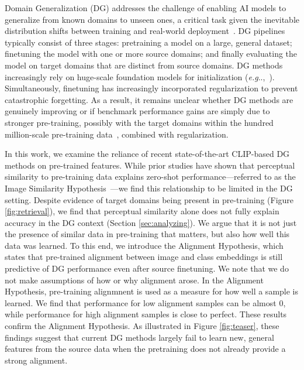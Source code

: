 \documentclass{article} %
\makeatletter
\DeclareRobustCommand\onedot{\futurelet\@let@token\@onedot}
\def\@onedot{\ifx\@let@token.\else.\null\fi\xspace}
\def\eg{\emph{e.g}\onedot} \def\Eg{\emph{E.g}\onedot}
\makeatother
\begin{document}
Domain Generalization (DG) addresses the challenge of enabling AI models to generalize from known domains to unseen ones, a critical task given the inevitable distribution shifts between training and real-world deployment~\citep{saenko2010adapting}. DG pipelines typically consist of three stages: pretraining a model on a large, general dataset; finetuning the model with one or more source domains; and finally evaluating the model on target domains that are distinct from source domains. DG methods increasingly rely on huge-scale foundation models for initialization (\eg,~\citep{shu2023clipood,cha2022miro,addepalli2024leveraging}). Simultaneously, finetuning has increasingly incorporated regularization to prevent catastrophic forgetting. As a result, it remains unclear whether DG methods are genuinely improving or if  benchmark performance gains are simply due to stronger pre-training, possibly with the target domains within the hundred million-scale pre-training data~\citep{mayilvahanan2025in}, combined with regularization.

In this work, we examine the reliance of recent state-of-the-art CLIP-based DG methods on pre-trained features. While prior studies have shown that perceptual similarity to pre-training data explains zero-shot performance—referred to as the Image Similarity Hypothesis~\citep{mayilvahanan2024does}—we find this relationship to be limited in the DG setting. Despite evidence of target domains being present in pre-training (Figure \ref{fig:retrieval}), we find that perceptual similarity alone does not fully explain accuracy in the DG context (Section \ref{sec:analyzing}). We argue that it is not just the presence of similar data in pre-training that matters, but also how well this data was learned. To this end, we introduce the Alignment Hypothesis, which states that pre-trained alignment  between image and class embeddings is still predictive of DG performance even after source finetuning.  We note that we do not make assumptions of how or why alignment arose. In the Alignment Hypothesis, pre-training alignmnent is used as a measure for how well a sample is learned.  We  find that performance for low alignment samples can be almost 0, while performance for high alignment samples is close to perfect. These results confirm the Alignment Hypothesis.  As illustrated in Figure \ref{fig:teaser}, these findings suggest that current DG methods largely fail to learn new, general features from the source data when the pretraining does not already provide a strong alignment.
\end{document}
